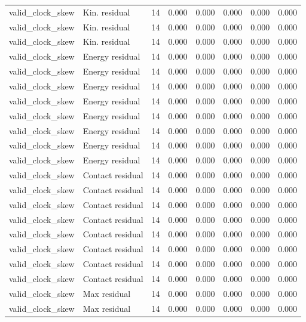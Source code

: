 {\begin{longtable}{llrrrrrr}
valid\_clock\_skew & Kin. residual & 14 & 0.000 & 0.000 & 0.000 & 0.000 & 0.000 \\
valid\_clock\_skew & Kin. residual & 14 & 0.000 & 0.000 & 0.000 & 0.000 & 0.000 \\
valid\_clock\_skew & Kin. residual & 14 & 0.000 & 0.000 & 0.000 & 0.000 & 0.000 \\
valid\_clock\_skew & Energy residual & 14 & 0.000 & 0.000 & 0.000 & 0.000 & 0.000 \\
valid\_clock\_skew & Energy residual & 14 & 0.000 & 0.000 & 0.000 & 0.000 & 0.000 \\
valid\_clock\_skew & Energy residual & 14 & 0.000 & 0.000 & 0.000 & 0.000 & 0.000 \\
valid\_clock\_skew & Energy residual & 14 & 0.000 & 0.000 & 0.000 & 0.000 & 0.000 \\
valid\_clock\_skew & Energy residual & 14 & 0.000 & 0.000 & 0.000 & 0.000 & 0.000 \\
valid\_clock\_skew & Energy residual & 14 & 0.000 & 0.000 & 0.000 & 0.000 & 0.000 \\
valid\_clock\_skew & Energy residual & 14 & 0.000 & 0.000 & 0.000 & 0.000 & 0.000 \\
valid\_clock\_skew & Energy residual & 14 & 0.000 & 0.000 & 0.000 & 0.000 & 0.000 \\
valid\_clock\_skew & Contact residual & 14 & 0.000 & 0.000 & 0.000 & 0.000 & 0.000 \\
valid\_clock\_skew & Contact residual & 14 & 0.000 & 0.000 & 0.000 & 0.000 & 0.000 \\
valid\_clock\_skew & Contact residual & 14 & 0.000 & 0.000 & 0.000 & 0.000 & 0.000 \\
valid\_clock\_skew & Contact residual & 14 & 0.000 & 0.000 & 0.000 & 0.000 & 0.000 \\
valid\_clock\_skew & Contact residual & 14 & 0.000 & 0.000 & 0.000 & 0.000 & 0.000 \\
valid\_clock\_skew & Contact residual & 14 & 0.000 & 0.000 & 0.000 & 0.000 & 0.000 \\
valid\_clock\_skew & Contact residual & 14 & 0.000 & 0.000 & 0.000 & 0.000 & 0.000 \\
valid\_clock\_skew & Contact residual & 14 & 0.000 & 0.000 & 0.000 & 0.000 & 0.000 \\
valid\_clock\_skew & Max residual & 14 & 0.000 & 0.000 & 0.000 & 0.000 & 0.000 \\
valid\_clock\_skew & Max residual & 14 & 0.000 & 0.000 & 0.000 & 0.000 & 0.000 \\

\end{longtable}}

